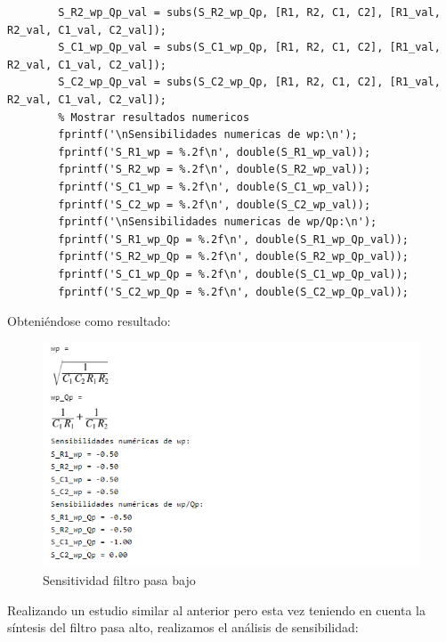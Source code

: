 \documentclass[12pt]{article}
\begin{document}
\begin{lstlisting}
	 	S_R2_wp_Qp_val = subs(S_R2_wp_Qp, [R1, R2, C1, C2], [R1_val, R2_val, C1_val, C2_val]);
	 	S_C1_wp_Qp_val = subs(S_C1_wp_Qp, [R1, R2, C1, C2], [R1_val, R2_val, C1_val, C2_val]);
	 	S_C2_wp_Qp_val = subs(S_C2_wp_Qp, [R1, R2, C1, C2], [R1_val, R2_val, C1_val, C2_val]);
	 	% Mostrar resultados numericos
	 	fprintf('\nSensibilidades numericas de wp:\n');
	 	fprintf('S_R1_wp = %.2f\n', double(S_R1_wp_val));
	 	fprintf('S_R2_wp = %.2f\n', double(S_R2_wp_val));
	 	fprintf('S_C1_wp = %.2f\n', double(S_C1_wp_val));
	 	fprintf('S_C2_wp = %.2f\n', double(S_C2_wp_val));
	 	fprintf('\nSensibilidades numericas de wp/Qp:\n');
	 	fprintf('S_R1_wp_Qp = %.2f\n', double(S_R1_wp_Qp_val));
	 	fprintf('S_R2_wp_Qp = %.2f\n', double(S_R2_wp_Qp_val));
	 	fprintf('S_C1_wp_Qp = %.2f\n', double(S_C1_wp_Qp_val));
	 	fprintf('S_C2_wp_Qp = %.2f\n', double(S_C2_wp_Qp_val));
	\end{lstlisting}
	
	Obteniéndose como resultado:
	\begin{figure}[h!]
		\includegraphics[width=1\linewidth]{Simulaciones_Imagenes/Sensitividad}
		\caption[Sensitividad filtro pasa bajo]{Sensitividad filtro pasa bajo}
		\label{fig:sensitividad}
	\end{figure}
	
	Realizando un estudio similar al anterior pero esta vez teniendo en cuenta la síntesis del filtro pasa alto, realizamos el análisis de sensibilidad:
	
\end{document}
